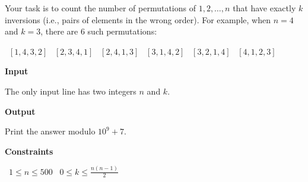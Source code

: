 Your task is to count the number of permutations of $1,2,\dots,n$ that have exactly $k$ inversions (i.e., pairs of elements in the wrong order).
For example, when $n=4$ and $k=3$, there are $6$ such permutations:

\textbullet\ $[1,4,3,2]$
\textbullet\ $[2,3,4,1]$
\textbullet\ $[2,4,1,3]$
\textbullet\ $[3,1,4,2]$
\textbullet\ $[3,2,1,4]$
\textbullet\ $[4,1,2,3]$

\vspace{0.3cm}\noindent\textbf{Input}

The only input line has two integers $n$ and $k$.

\vspace{0.3cm}\noindent\textbf{Output}

Print the answer modulo $10^9+7$.

\vspace{0.3cm}\noindent\textbf{Constraints}

\textbullet\ $1 \le n \le 500$
\textbullet\ $0 \le k \le \frac{n(n-1)}{2}$